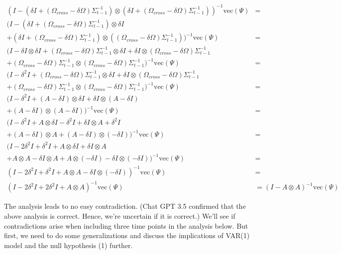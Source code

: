 \documentclass[
  letterpaper,
  DIV=11,
  numbers=noendperiod]{scrartcl}
\begin{document}
\[
\begin{align*}
(I-(\delta I + (\Omega_{cross} - \delta \Omega)\Sigma_{t-1}^{-1}) \otimes (\delta I + (\Omega_{cross} - \delta \Omega)\Sigma_{t-1}^{-1}))^{-1} \text{vec}(\Psi) &= 
\\  (I-(\delta I + (\Omega_{cross} - \delta \Omega)\Sigma_{t-1}^{-1}) \otimes\delta I \\+ (\delta I + (\Omega_{cross} - \delta \Omega)\Sigma_{t-1}^{-1})\otimes ((\Omega_{cross} - \delta \Omega)\Sigma_{t-1}^{-1}))^{-1} \text{vec}(\Psi)&=
\\
(I-\delta I\otimes \delta I + (\Omega_{cross} - \delta \Omega)\Sigma_{t-1}^{-1} \otimes\delta I + \delta I\otimes(\Omega_{cross} - \delta \Omega)\Sigma_{t-1}^{-1}
\\+  
(\Omega_{cross} - \delta \Omega)\Sigma_{t-1}^{-1}\otimes (\Omega_{cross} - \delta \Omega)\Sigma_{t-1}^{-1})^{-1} \text{vec}(\Psi)&=
\\
(I-\delta^2I+(\Omega_{cross} - \delta \Omega)\Sigma_{t-1}^{-1} \otimes\delta I + \delta I\otimes(\Omega_{cross} - \delta \Omega)\Sigma_{t-1}^{-1}
\\+(\Omega_{cross} - \delta \Omega)\Sigma_{t-1}^{-1}\otimes (\Omega_{cross} - \delta \Omega)\Sigma_{t-1}^{-1})^{-1} \text{vec}(\Psi)&=
\\
(I-\delta^2I+(A- \delta I) \otimes\delta I + \delta I\otimes(A- \delta I)
\\+(A- \delta I)\otimes (A- \delta I))^{-1} \text{vec}(\Psi)&=
\\
(I-\delta^2I + A\otimes \delta I - \delta^2I + \delta I\otimes A + \delta^2I
\\+ (A- \delta I)\otimes A + (A- \delta I)\otimes (- \delta I))^{-1} \text{vec}(\Psi)&=
\\
(I-2\delta^2I+ \delta^2I + A\otimes \delta I + \delta I\otimes A 
\\+ A\otimes A - \delta I\otimes A + A\otimes(- \delta I) - \delta I\otimes (- \delta I))^{-1} \text{vec}(\Psi)&=
\\
(I-2\delta^2I+ \delta^2I  
+ A\otimes A   - \delta I\otimes (- \delta I))^{-1} \text{vec}(\Psi)&=
\\
(I-2\delta^2I+ 2\delta^2I  
+ A\otimes A  )^{-1} \text{vec}(\Psi)&=
(I-A\otimes A  )^{-1} \text{vec}(\Psi)
\end{align*}
\]

The analysis leads to no easy contradiction. (Chat GPT 3.5 confirmed
that the above analysis is correct. Hence, we're uncertain if it is
correct.) We'll see if contradictions arise when including three time
points in the analysis below. But first, we need to do some
generalizations and discuss the implications of VAR(1) model and the
null hypothesis (1) further.
\end{document}
